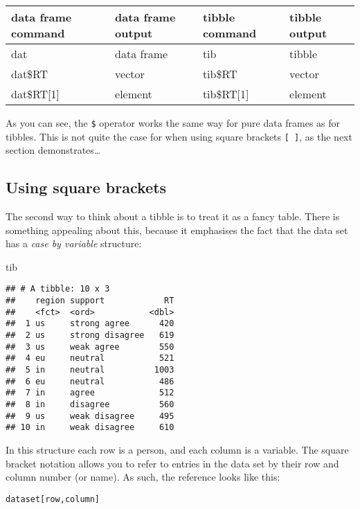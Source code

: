 \documentclass[]{book}
\newenvironment{Shaded}{\begin{snugshade}}{\end{snugshade}}
\newcommand{\NormalTok}[1]{#1}
\begin{document}
\begin{tabular}{l|l|l|l}
\hline
data frame command & data frame output & tibble command & tibble output\\
\hline
dat & data frame & tib & tibble\\
\hline
dat\$RT & vector & tib\$RT & vector\\
\hline
dat\$RT[1] & element & tib\$RT[1] & element\\
\hline
\end{tabular}

As you can see, the \texttt{\$} operator works the same way for pure data frames as for tibbles. This is not quite the case for when using square brackets \texttt{{[}\ {]}}, as the next section demonstrates\ldots{}

\hypertarget{using-square-brackets}{%
\subsection{Using square brackets}\label{using-square-brackets}}

The second way to think about a tibble is to treat it as a fancy table. There is something appealing about this, because it emphasises the fact that the data set has a \emph{case by variable} structure:

\begin{Shaded}
\begin{Highlighting}[]
\NormalTok{tib}
\end{Highlighting}
\end{Shaded}

\begin{verbatim}
## # A tibble: 10 x 3
##    region support            RT
##    <fct>  <ord>           <dbl>
##  1 us     strong agree      420
##  2 us     strong disagree   619
##  3 us     weak agree        550
##  4 eu     neutral           521
##  5 in     neutral          1003
##  6 eu     neutral           486
##  7 in     agree             512
##  8 in     disagree          560
##  9 us     weak disagree     495
## 10 in     weak disagree     610
\end{verbatim}

In this structure each row is a person, and each column is a variable. The square bracket notation allows you to refer to entries in the data set by their row and column number (or name). As such, the reference looks like this:

\begin{verbatim}
dataset[row,column]
\end{verbatim}
\end{document}
